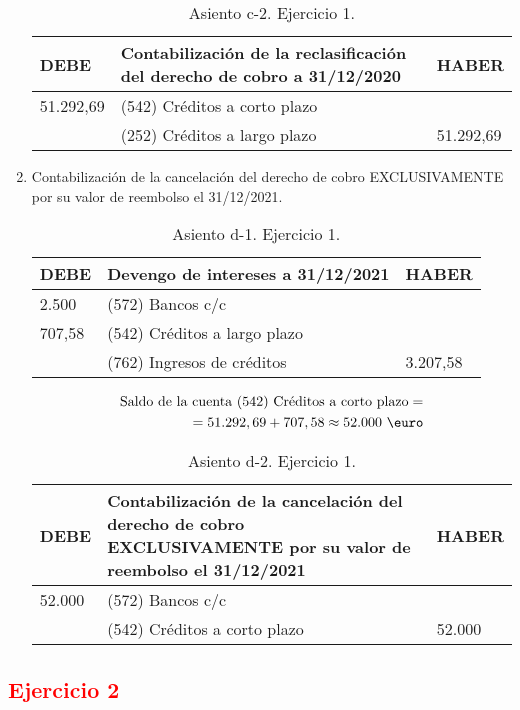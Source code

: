 \begin{enumerate}[label=\alph*)]
    \begin{table}[H]
        \centering
        \begin{tabular}{|p{3cm}|p{6cm}|p{3cm}|}
        \hline
        \rowcolor{blue!30}
        \textbf{DEBE} & \textbf{Contabilización de la reclasificación del derecho de cobro a 31/12/2020} & \textbf{HABER} \\
        \hline
        51.292,69 & (542) Créditos a corto plazo & \\
        \hline
        & (252) Créditos a largo plazo & 51.292,69 \\
        \hline
        \end{tabular}
        \caption{Asiento c-2. Ejercicio 1.}
        \label{tabla:asiento4ej1T2}
    \end{table}

    \item Contabilización de la cancelación del derecho de cobro EXCLUSIVAMENTE por su valor de reembolso el 31/12/2021.
    
    \begin{table}[H]
        \centering
        \begin{tabular}{|p{3cm}|p{6cm}|p{3cm}|}
        \hline
        \rowcolor{blue!30}
        \textbf{DEBE} & \textbf{Devengo de intereses a 31/12/2021} & \textbf{HABER} \\
        \hline
        2.500 & (572) Bancos c/c & \\
        \hline
        707,58 & (542) Créditos a largo plazo & \\
        \hline
        & (762) Ingresos de créditos & 3.207,58 \\
        \hline
        \end{tabular}
        \caption{Asiento d-1. Ejercicio 1.}
        \label{tabla:asiento5ej1T2}
    \end{table}
    \begin{align*}
        \text{Saldo de la cuenta (542) Créditos a corto plazo} = \\ = 51.292,69 + 707,58 \approx \text{52.000} \text{ \euro}
    \end{align*}

    \begin{table}[H]
        \centering
        \begin{tabular}{|p{3cm}|p{6cm}|p{3cm}|}
        \hline
        \rowcolor{blue!30}
        \textbf{DEBE} & \textbf{Contabilización de la cancelación del derecho de cobro EXCLUSIVAMENTE por su valor de reembolso el 31/12/2021} & \textbf{HABER} \\
        \hline
        52.000 & (572) Bancos c/c & \\
        \hline
        & (542) Créditos a corto plazo & 52.000 \\
        \hline
        \end{tabular}
        \caption{Asiento d-2. Ejercicio 1.}
        \label{tabla:asiento6ej1T2}
    \end{table}
\end{enumerate}

\newpage 
\subsection*{\textcolor{red}{\textbf{Ejercicio 2}}}







